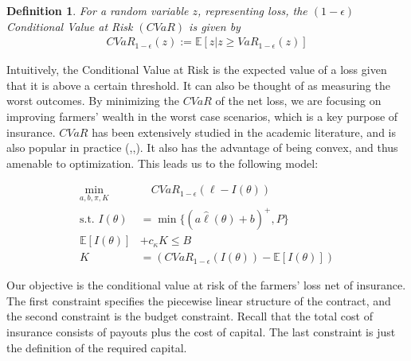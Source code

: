 \documentclass[11pt]{article}
\newtheorem{defn}[lemma]{Definition}
\begin{document}
  \begin{defn}
    For a random variable $z$, representing loss, the $(1-\epsilon)$ Conditional Value at Risk $(CVaR)$ is given by 
    \begin{align*}
      CVaR_{1-\epsilon}(z) := \mathbb{E}\left [z | z \geq VaR_{1-\epsilon}(z) \right ]
    \end{align*}
  \end{defn}

  Intuitively, the Conditional Value at Risk is the expected value of a loss given that it is above a certain threshold. It can also be thought of as measuring the worst outcomes. By minimizing the $CVaR$ of the net loss, we are focusing on improving farmers' wealth in the worst case scenarios, which is a key purpose of insurance. $CVaR$ has been extensively studied in the academic literature, and is also popular in practice (\cite{rockafellar2000optimization},\cite{rockafellar2002conditional},\cite{artzner1999coherent}). It also has the advantage of being convex, and thus amenable to optimization. This leads us to the following model: 

  \begin{align}
  \min_{a,b,\pi, K}  & \quad CVaR_{1-\epsilon}\left ( \ell - I(\theta) \right)\\
  \text{s.t.   }I(\theta) &= \min \{ (a\hat{\ell}(\theta) + b)^+,P \} \\
  \mathbb{E}\left [ I(\theta) \right ] &+ c_{\kappa} K \leq B \\
  K &= \left( CVaR_{1-\epsilon}\left ( I(\theta) \right ) - \mathbb{E}[I(\theta)] \right) \label{cons-budget}
  \end{align}

  Our objective is the conditional value at risk of the farmers' loss net of insurance. The first constraint specifies the piecewise linear structure of the contract, and the second constraint is the budget constraint. Recall that the total cost of insurance consists of payouts plus the cost of capital. The last constraint is just the definition of the required capital. 
  
\end{document}
